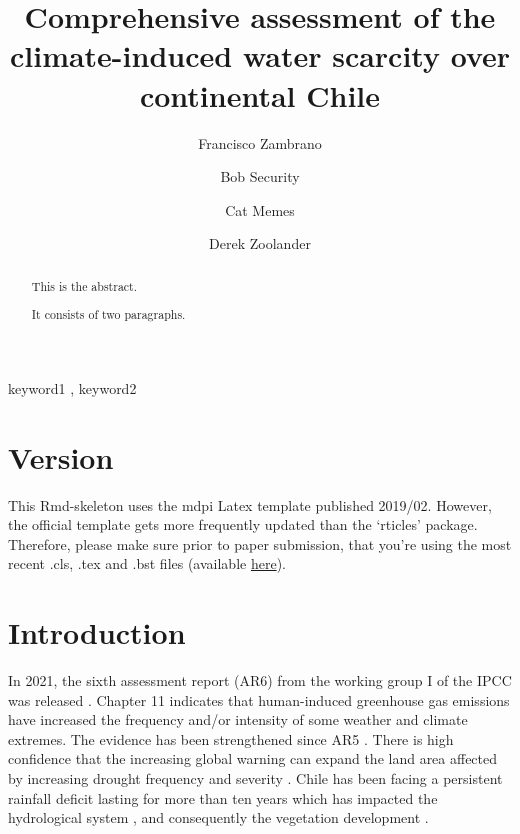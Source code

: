 \documentclass[preprint,
3p]{elsarticle} %
\begin{document}
\begin{frontmatter}

  \title{Comprehensive assessment of the climate-induced water scarcity
over continental Chile}
    \author[Hemere Centro de Observación de la Tierra,Universidad
Mayor]{Francisco Zambrano%
  }
    \author[Another University]{Bob Security%
  }
    \author[Another University]{Cat Memes%
  }
    \author[Some Institute of Technology]{Derek Zoolander%
  }
  
  \begin{abstract}
  This is the abstract.

  It consists of two paragraphs.
  \end{abstract}
    \begin{keyword}
    keyword1 \sep 
    keyword2
  \end{keyword}
  
 \end{frontmatter}

\hypertarget{version}{%
\section{Version}\label{version}}

This Rmd-skeleton uses the mdpi Latex template published 2019/02.
However, the official template gets more frequently updated than the
`rticles' package. Therefore, please make sure prior to paper
submission, that you're using the most recent .cls, .tex and .bst files
(available \href{http://www.mdpi.com/authors/latex}{here}).

\hypertarget{introduction}{%
\section{Introduction}\label{introduction}}

In 2021, the sixth assessment report (AR6) from the working group I of
the IPCC was released \citep{IPCC2021}. Chapter 11 \citep{IPCCCH112021}
indicates that human-induced greenhouse gas emissions have increased the
frequency and/or intensity of some weather and climate extremes. The
evidence has been strengthened since AR5 \citep{IPCC2013}. There is high
confidence that the increasing global warning can expand the land area
affected by increasing drought frequency and severity
\citep{IPCCCH112021}. Chile has been facing a persistent rainfall
deficit lasting for more than ten years \citep{Garreaud2017} which has
impacted the hydrological system \citep{Boisier2018}, and consequently
the vegetation development \citep{Zambrano2020}.
\end{document}
